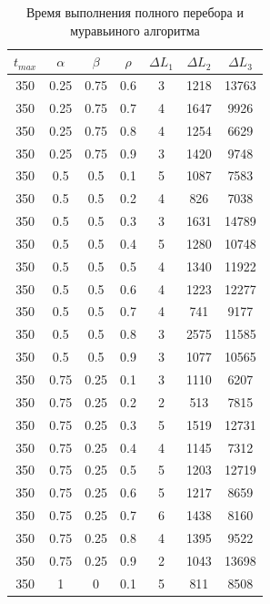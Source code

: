 \documentclass[12pt]{report}
\begin{document}
\begin{table}[H]
\begin{center}
\begin{tabular}{|c|c|c|c|c|c|c|}
				\hline
			\end{tabular}
		\end{center}
	\end{table}
	\begin{table}[H]
		\begin{center}
			\caption[]{\label{tbl:only10} Время выполнения полного перебора и муравьиного алгоритма}
			\begin{tabular}{|c|c|c|c|c|c|c|}
				\hline
				$t_{max}$ & $\alpha$ & $\beta$ & $\rho$ & $\Delta L_{1}$ & $\Delta L_{2}$ & $\Delta L_{3}$\\
				\hline
				350 & 0.25 & 0.75 & 0.6 & 3 & 1218 & 13763 \\
				350 & 0.25 & 0.75 & 0.7 & 4 & 1647 & 9926 \\
				350 & 0.25 & 0.75 & 0.8 & 4 & 1254 & 6629 \\
				350 & 0.25 & 0.75 & 0.9 & 3 & 1420 & 9748 \\
				350 & 0.5 & 0.5 & 0.1 & 5 & 1087 & 7583 \\
				350 & 0.5 & 0.5 & 0.2 & 4 & 826 & 7038 \\
				350 & 0.5 & 0.5 & 0.3 & 3 & 1631 & 14789 \\
				350 & 0.5 & 0.5 & 0.4 & 5 & 1280 & 10748 \\
				350 & 0.5 & 0.5 & 0.5 & 4 & 1340 & 11922 \\
				350 & 0.5 & 0.5 & 0.6 & 4 & 1223 & 12277 \\
				350 & 0.5 & 0.5 & 0.7 & 4 & 741 & 9177 \\
				350 & 0.5 & 0.5 & 0.8 & 3 & 2575 & 11585 \\
				350 & 0.5 & 0.5 & 0.9 & 3 & 1077 & 10565 \\
				350 & 0.75 & 0.25 & 0.1 & 3 & 1110 & 6207 \\
				350 & 0.75 & 0.25 & 0.2 & 2 & 513 & 7815 \\
				350 & 0.75 & 0.25 & 0.3 & 5 & 1519 & 12731 \\
				350 & 0.75 & 0.25 & 0.4 & 4 & 1145 & 7312 \\
				350 & 0.75 & 0.25 & 0.5 & 5 & 1203 & 12719 \\
				350 & 0.75 & 0.25 & 0.6 & 5 & 1217 & 8659 \\
				350 & 0.75 & 0.25 & 0.7 & 6 & 1438 & 8160 \\
				350 & 0.75 & 0.25 & 0.8 & 4 & 1395 & 9522 \\
				350 & 0.75 & 0.25 & 0.9 & 2 & 1043 & 13698 \\
				350 & 1 & 0 & 0.1 & 5 & 811 & 8508 \\

\end{tabular}
\end{center}
\end{table}
\end{document}
